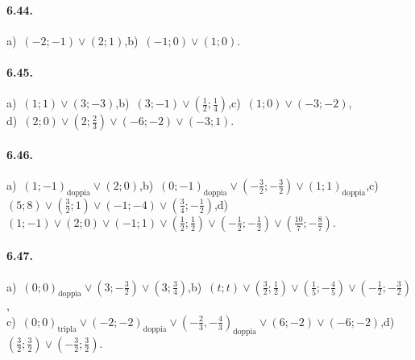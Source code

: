 \paragraph{6.44.} a)~$(-2;-1)\vee(2;1)$,\quad b)~$(-1;0)\vee(1;0)$.

\paragraph{6.45.} a)~$(1;1)\vee(3;-3)$,\quad b)~$(3;-1)\vee\left(\frac 1 2;\frac 1 4\right)$,\quad c)~$(1;0)\vee(-3;-2)$,\protect\\
\quad d)~$(2;0)\vee\left(2;\frac 2 3\right)\vee(-6;-2)\vee(-3;1)$.

\paragraph{6.46.} a)~$(1;-1)_\text{doppia} \vee(2;0)$,\quad b)~$(0;-1)_\text{doppia}\vee\left(-\frac 3 2;-\frac 3 2\right)\vee(1;1)_\text{doppia}$,\quad c)~$(5;8)\vee\left(\frac 3 2;1\right)\vee(-1;-4)\vee\left(\frac 3 4;-\frac 1 2\right)$,\quad d)~$(1;-1)\vee(2;0)\vee(-1;1)\vee\left(\frac 1 2;\frac 1 2\right)\vee\left(-\frac 1 2;-\frac 1 2\right)\vee\left(\frac{10} 7;-\frac 8 7\right)$.

\paragraph{6.47.}a)~$(0;0)_\text{doppia}\vee\left(3;-\frac 3 2\right)\vee(3;\frac 3 4)$,\quad b)~$(t;t)\vee\left(\frac 3 2;\frac 1 2\right)\vee\left(\frac 1 5;-\frac 4 5\right)\vee\left(-\frac 1 2;-\frac 3 2\right)$,\protect\\
\quad c)~$(0;0)_\text{tripla}\vee(-2;-2)_\text{doppia}\vee\left(-\frac 2 3,-\frac 4 3\right)_\text{doppia}\vee(6;-2)\vee(-6;-2)$,\quad d)~$\left(\frac 3 2;\frac 3 2\right)\vee\left(-\frac 3 2;\frac 3 2\right)$.

